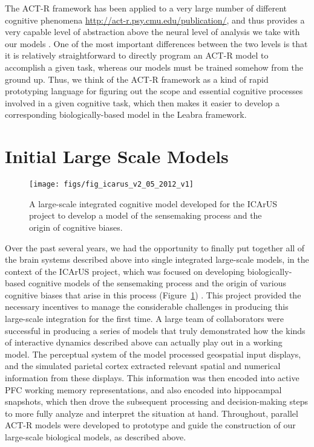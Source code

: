 \documentclass[11pt,twoside]{article}
\newif\myifpdf
\begin{document}
The ACT-R framework has been applied to a very large number of different cognitive phenomena \url{http://act-r.psy.cmu.edu/publication/}, and thus provides a very capable level of abstraction above the neural level of analysis we take with our models \cite{JilkLebiereOReillyEtAl08}.  One of the most important differences between the two levels is that it is relatively straightforward to directly program an ACT-R model to accomplish a given task, whereas our models must be trained somehow from the ground up.  Thus, we think of the ACT-R framework as a kind of rapid prototyping language for figuring out the scope and essential cognitive processes involved in a given cognitive task, which then makes it easier to develop a corresponding biologically-based model in the Leabra framework.

\section{Initial Large Scale Models}

\begin{figure}
  \centering\texttt{[image: figs/fig\_icarus\_v2\_05\_2012\_v1]}
  \caption{\small A large-scale integrated cognitive model developed for the ICArUS project to develop a model of the sensemaking process and the origin of cognitive biases.}
  \label{fig.icarus}
\end{figure}

Over the past several years, we had the opportunity to finally put together all of the brain systems described above into single integrated large-scale models, in the context of the ICArUS project, which was focused on developing biologically-based cognitive models of the sensemaking process and the origin of various cognitive biases that arise in this process (Figure~\ref{fig.icarus}) \cite{HerdKruegerKrieteEtAl13,ZieglerChelianBenvenutoEtAl14}.  This project provided the necessary incentives to manage the considerable challenges in producing this large-scale integration for the first time.  A large team of collaborators were successful in producing a series of models that truly demonstrated how the kinds of interactive dynamics described above can actually play out in a working model.  The perceptual system of the model processed geospatial input displays, and the simulated parietal cortex extracted relevant spatial and numerical information from these displays.  This information was then encoded into active PFC working memory representations, and also encoded into hippocampal snapshots, which then drove the subsequent processing and decision-making steps to more fully analyze and interpret the situation at hand.  Throughout, parallel ACT-R models were developed to prototype and guide the construction of our large-scale biological models, as described above.
\end{document}
